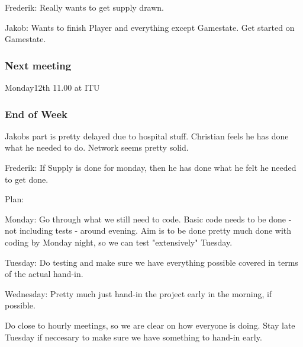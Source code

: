 Frederik: Really wants to get supply drawn.

Jakob: Wants to finish Player and everything except Gamestate. Get started on Gamestate.
\subsubsection{Next meeting}
Monday12th 11.00 at ITU
\subsubsection{End of Week}
Jakobs part is pretty delayed due to hospital stuff. Christian feels he has done what he needed to do. Network seems pretty solid.

Frederik:  If Supply is done for monday, then he has done what he felt he needed to get done.

Plan:

Monday: Go through what we still need to code. Basic code needs to be done - not including tests - around evening. Aim is to be done pretty much done with coding by Monday night, so we can test "extensively" Tuesday.

Tuesday: Do testing and make sure we have everything possible covered in terms of the actual hand-in.

Wednesday: Pretty much just hand-in the project early in the morning, if possible.

Do close to hourly meetings, so we are clear on how everyone is doing. Stay late Tuesday if neccesary to make sure we have something to hand-in early.